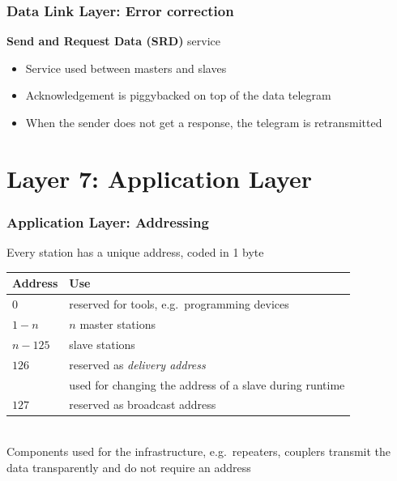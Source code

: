 \documentclass{beamer}
\begin{document}
\begin{frame}
  \frametitle{Data Link Layer: Error correction}
  \textbf{Send and Request Data (SRD)} service
  \begin{itemize}
    \item Service used between masters and slaves
    \item Acknowledgement is piggybacked on top of the data telegram
    \item When the sender does not get a response, the telegram is retransmitted
  \end{itemize}
\end{frame}


\section{Layer 7: Application Layer}
\begin{frame}
  \frametitle{Application Layer: Addressing}
  Every station has a unique address, coded in 1 byte
  \begin{center}
    \footnotesize
    \begin{tabular}[h]{l|l}
      \textbf{Address}  & \textbf{Use} \\
      \hline
      $0$               & reserved for tools, e.g.\ programming devices \\
      $1 - n$           & $n$ master stations \\
      $n - 125$         & slave stations \\
      $126$             & reserved as \textit{delivery address} \\
                        & used for changing the address of a slave during runtime \\
      $127$             & reserved as broadcast address
    \end{tabular}
    \normalsize
  \end{center}
  \hfill \\
  Components used for the infrastructure, e.g.\ repeaters, couplers transmit the data transparently
  and do not require an address \\
\end{frame}
\end{document}
